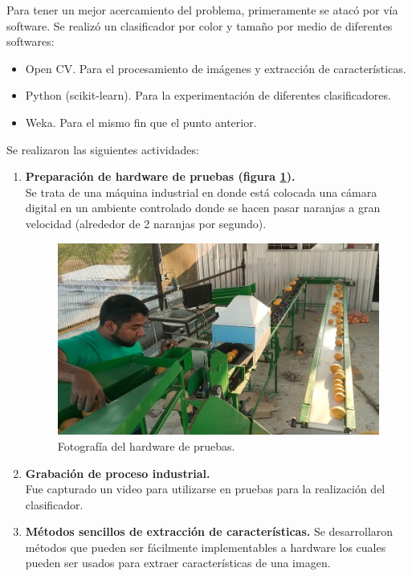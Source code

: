 \documentclass[twoside,spanish,ESP,MSc]{plantillaLabUPV}
\theoremstyle{definition}
\begin{document}
\begin{enumerate}
	Para tener un mejor acercamiento del problema, primeramente se atacó por vía software. Se realizó un clasificador por color y tamaño por medio de diferentes softwares:
	
	\begin{itemize}
		\item Open CV. Para el procesamiento de imágenes y extracción de características.
		\item Python (scikit-learn). Para la experimentación de diferentes clasificadores.
		\item Weka. Para el mismo fin que el punto anterior.
	\end{itemize}
	

Se realizaron las siguientes actividades:

\begin{enumerate}
	\item \textbf{Preparación de hardware de pruebas (figura \ref{maq}).}\\Se trata de una máquina industrial en donde está colocada una cámara digital en un ambiente controlado donde se hacen pasar naranjas a gran velocidad (alrededor de 2 naranjas por segundo).
	
	\begin{figure}[h]
		\centering
		\includegraphics*[scale=0.275]{maq} 
		\caption{Fotografía del hardware de pruebas.}
		\label{maq}
	\end{figure}
	
	\item \textbf{Grabación de proceso industrial.}\\Fue capturado un video para utilizarse en pruebas para la realización del clasificador.
	
	
	\item \textbf{Métodos sencillos de extracción de características.} Se desarrollaron métodos que pueden ser fácilmente implementables a hardware los cuales pueden ser usados para extraer características de una imagen. 
	

\end{enumerate}
\end{enumerate}
\end{document}
